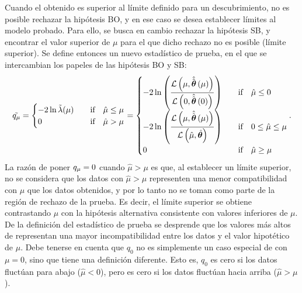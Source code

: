Cuando el \pval obtenido es superior al límite definido para un descubrimiento, no es posible rechazar la hipótesis \ac{BO}, y en ese caso se desea establecer límites al modelo probado. Para ello, se busca en cambio rechazar la hipótesis \ac{SB}, y encontrar el valor superior de \(\mu\) para el que dicho rechazo no es posible (límite superior). Se define entonces un nuevo estadístico de prueba, en el que se intercambian los papeles de las hipótesis \ac{BO} y \ac{SB}:
\begin{equation}
    \tilde{\qmu} =
    \begin{cases}
        -2 \ln \tilde{\lambda}(\mu) & \qif \hat{\mu} \leq \mu\\
        0                           & \qif \hat{\mu} > \mu
    \end{cases}
    =
    \begin{cases}
        \displaystyle -2 \ln \left(\frac{
            \mathcal{L} \left(\mu, \hat{\hat{\bm{\theta}}} \left(\mu\right)\right)
        }{
            \mathcal{L} \left(0, \hat{\hat{\bm{\theta}}} \left(0\right)\right)
        }\right) & \qif \hat{\mu} \leq 0\\
        \displaystyle -2 \ln \left(\frac{
            \mathcal{L} \left(\mu, \hat{\hat{\bm{\theta}}} \left(\mu\right)\right)
        }{
            \mathcal{L} \left(\hat{\mu}, \hat{\bm{\theta}}\right)
        }\right) & \qif 0 \leq \hat{\mu} \leq \mu\\
        0 & \qif \hat{\mu} \geq \mu\\
    \end{cases}.
\end{equation}
La razón de poner \(q_{\mu} = 0\) cuando \(\hat{\mu} > \mu\) es que, al establecer un límite superior, no se considera que los datos con \(\hat{\mu} > \mu\) representen una menor compatibilidad con \(\mu\) que los datos obtenidos, y por lo tanto no se toman como parte de la región de rechazo de la prueba. Es decir, el límite superior se obtiene contrastando \(\mu\) con la hipótesis alternativa consistente con valores inferiores de \(\mu\). De la definición del estadístico de prueba se desprende que los valores más altos de \qmu representan una mayor incompatibilidad entre los datos y el valor hipotético de \(\mu\). Debe tenerse en cuenta que \(q_0\) no es simplemente un caso especial de \qmu con \(\mu = 0\), sino que tiene una definición diferente. Esto es, \(q_0\) es cero si los datos fluctúan para abajo (\(\hat{\mu} < 0\)), pero \qmu es cero si los datos fluctúan hacia arriba (\(\hat{\mu} > \mu\)).

